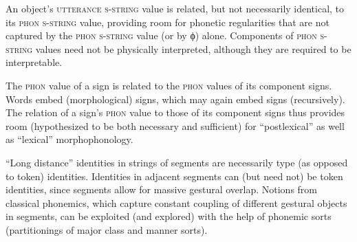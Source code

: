 \documentclass[output=paper]{langsci/langscibook}
\begin{document}
An object's \textsc{utterance s-string} value is related, but not necessarily
identical, to its \textsc{phon s-string} value, providing room for phonetic
regularities that are not captured by the \textsc{phon s-string} value (or by
ϕ) alone. Components of \textsc{phon s-string} values need not be
physically interpreted, although they are required to be interpretable.

The \textsc{phon} value of a sign is related to the \textsc{phon} values of its
component signs.  Words embed (morphological) signs, which may again embed
signs (recursively). The relation of a sign's \textsc{phon} value to those of
its component signs thus provides room (hypothesized to be both necessary
and sufficient) for ``postlexical'' as well as ``lexical'' morphophonology.

``Long distance'' identities in strings of segments are necessarily type
(as opposed to token) identities. Identities in adjacent segments can (but
need not) be token identities, since segments allow for massive gestural
overlap. Notions from classical phonemics, which capture constant coupling
of different gestural objects in segments, can be exploited (and explored)
with the help of phonemic sorts 
(partitionings of major class and manner sorts).


\printbibliography[heading=subbibliography,notkeyword=this]
\label{chap-phonology-end}
\end{document}
